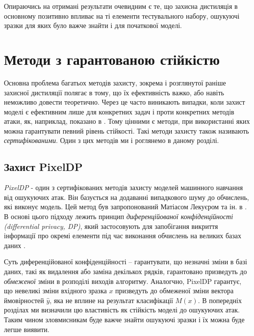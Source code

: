 \documentclass[14pt,a4paper]{extarticle}
\newcounter{e}
\numberwithin{equation}{section}
\numberwithin{figure}{section}
\begin{document}
 Опираючись на отримані результати очевидним є те, що захисна дистиляція в основному позитивно впливає на ті елементи тестувального набору, ошукуючі зразки для яких було важче знайти і для початкової моделі.
 
 \newpage
 \thispagestyle{empty}
 \section{Методи з гарантованою стійкістю}
 Основна проблема багатьох методів захисту, зокрема і розглянутої раніше захисної дистиляції полягає в тому, що їх ефективність важко, або навіть неможливо довести теоретично. Через це часто виникають випадки, коли захист моделі є ефективним лише для конкретних задач і проти конкретних методів атаки, як, наприклад, показано в \cite{distillation-not-robust}. Тому цінними є методи, при використанні яких можна гарантувати певний рівень стійкості. Такі методи захисту також називають \textit{сертифікованими}. Один з цих методів ми і роглянемо в даному розділі.
 
 \subsection{Захист PixelDP}
 \textit{PixelDP} - один з сертифікованих методів захисту моделей машинного навчання від ошукуючих атак. Він базується на додаванні випадкового шуму до обчислень, які виконує модель. Цей метод був запропонований Матіасом Лекуєром та ін. в \cite{pixeldp}. В основі цього підходу лежить принцип \textit{диференційованої конфіденційності (differential privacy, DP)}, який застосовують для запобігання викриття інформації про окремі елементи під час виконання обчислень на великих базах даних \cite{differential-privacy}.
 
 Суть диференційованої конфіденційності -- гарантувати, що незначні зміни в базі даних, такі як видалення або заміна декількох рядків, гарантовано призведуть до \textit{обмеженої} зміни в розподілі виходів алгоритму. Аналогчно, PixelDP гарантує, що невеликі зміни вхідного зразка $x$ призведуть до обмеженої зміни вектора ймовірностей $\hat{y}$, яка не вплине на результат класифікації $M(x)$. В попередніх розділах ми визначили цю властивість як стійкість моделі до ошукуючих атак. Таким чином зловмисникам буде важче знайти ошукуючі зразки і їх можна буде легше виявити.
 
\end{document}
